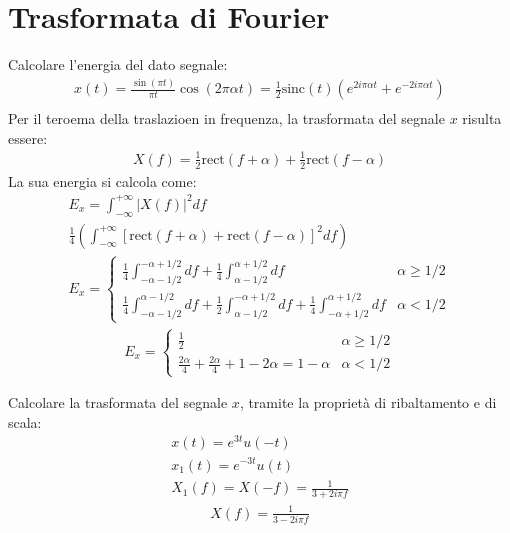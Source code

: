 \documentclass{article}
\begin{document}
\clearpage

\section{Trasformata di Fourier}
Calcolare l'energia del dato segnale:
\begin{gather*}
    x(t)=\displaystyle\frac{\sin(\pi t)}{\pi t}\cos(2\pi \alpha t)=\frac{1}{2}\mbox{sinc}(t)(e^{2i\pi\alpha t}+e^{-2i\pi\alpha t})\\
\end{gather*}
Per il teroema della traslazioen in frequenza, la trasformata del segnale $x$ risulta essere:
\begin{gather*}
    X(f)=\displaystyle\frac{1}{2}\mbox{rect}(f+\alpha)+\frac{1}{2}\mbox{rect}(f-\alpha)
\end{gather*}
La sua energia si calcola come:
\begin{gather*}
    E_x=\displaystyle\int_{-\infty}^{+\infty}|X(f)|^2df\\
    \displaystyle\frac{1}{4}\left(\int_{-\infty}^{+\infty}\left[\mbox{rect}(f+\alpha)+\mbox{rect}(f-\alpha)\right]^2df\right)\\
    E_x=\begin{cases}
        \displaystyle\frac{1}{4}\int_{-\alpha-1/2}^{-\alpha+1/2}df+\frac{1}{4}\int_{\alpha-1/2}^{\alpha+1/2}df& \alpha\geq1/2\\
        \displaystyle\frac{1}{4}\int_{-\alpha-1/2}^{\alpha-1/2}df+\frac{1}{2}\int_{\alpha-1/2}^{-\alpha+1/2}df+\frac{1}{4}\int_{-\alpha+1/2}^{\alpha+1/2}df&\alpha<1/2
    \end{cases}
\end{gather*}
\begin{gather}
    E_x=\begin{cases}
        \displaystyle\frac{1}{2}&\alpha\geq1/2\\
        \displaystyle\frac{2\alpha}{4}+\frac{2\alpha}{4}+1-2\alpha=1-\alpha&\alpha<1/2
    \end{cases}
\end{gather}


Calcolare la trasformata del segnale $x$, tramite la proprietà di ribaltamento e di scala: 
\begin{gather*}
    x(t)=e^{3t}u(-t)\\
    x_1(t)=e^{-3t}u(t)\\
    X_1(f)=X(-f)=\displaystyle\frac{1}{3+2i\pi f}
\end{gather*}
\begin{gather}
    X(f)=\displaystyle\frac{1}{3-2i\pi f}
\end{gather}
\end{document}
